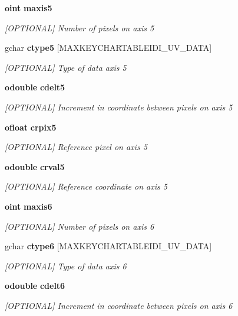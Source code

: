 \begin{CompactItemize}
{\bf oint} {\bf maxis5}
\begin{CompactList}\small\item\em [OPTIONAL] Number of pixels on axis 5 \item\end{CompactList}\item 
gchar {\bf ctype5} [MAXKEYCHARTABLEIDI\_\-UV\_\-DATA]
\begin{CompactList}\small\item\em [OPTIONAL] Type of data axis 5 \item\end{CompactList}\item 
{\bf odouble} {\bf cdelt5}
\begin{CompactList}\small\item\em [OPTIONAL] Increment in coordinate between pixels on axis 5 \item\end{CompactList}\item 
{\bf ofloat} {\bf crpix5}
\begin{CompactList}\small\item\em [OPTIONAL] Reference pixel on axis 5 \item\end{CompactList}\item 
{\bf odouble} {\bf crval5}
\begin{CompactList}\small\item\em [OPTIONAL] Reference coordinate on axis 5 \item\end{CompactList}\item 
{\bf oint} {\bf maxis6}
\begin{CompactList}\small\item\em [OPTIONAL] Number of pixels on axis 6 \item\end{CompactList}\item 
gchar {\bf ctype6} [MAXKEYCHARTABLEIDI\_\-UV\_\-DATA]
\begin{CompactList}\small\item\em [OPTIONAL] Type of data axis 6 \item\end{CompactList}\item 
{\bf odouble} {\bf cdelt6}
\begin{CompactList}\small\item\em [OPTIONAL] Increment in coordinate between pixels on axis 6 \item\end{CompactList}\item 

\end{CompactItemize}
